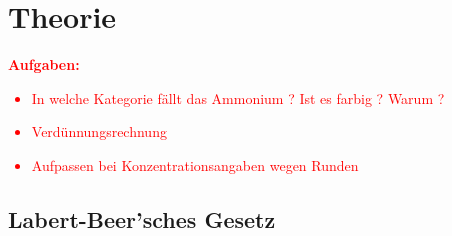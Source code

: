 \section{Theorie}
\label{sec:theorie}

\textbf{\textcolor{red}{Aufgaben:}}
\textcolor{red}{
	\begin{itemize}
		\item In welche Kategorie fällt das Ammonium ? Ist es farbig ? Warum ?
		\item Verdünnungsrechnung
		\item Aufpassen bei Konzentrationsangaben wegen Runden
	\end{itemize}
}

\subsection{Labert-Beer'sches Gesetz}

